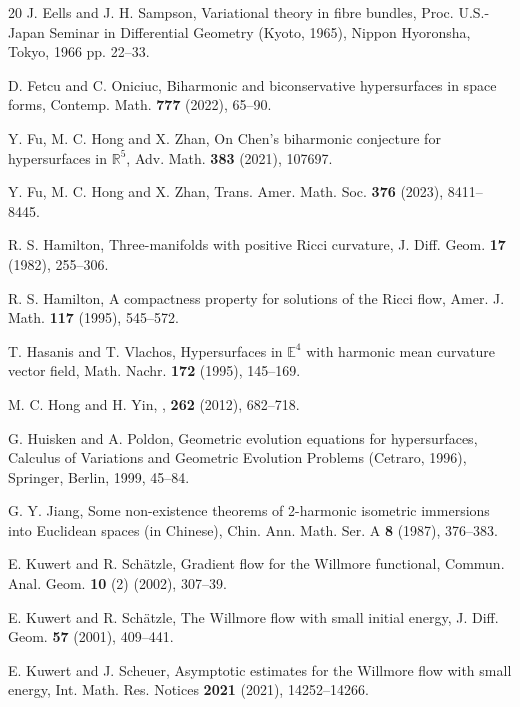\documentclass{amsart}
\theoremstyle{definition}
\numberwithin{equation}{section}
\begin{document}
{\begin{thebibliography}{20}
J. Eells and J. H. Sampson, Variational theory in fibre bundles,  Proc. U.S.-Japan Seminar
in Differential Geometry (Kyoto, 1965), Nippon Hyoronsha, Tokyo, 1966 pp. 22--33.

D. Fetcu and C. Oniciuc, {Biharmonic and biconservative
	hypersurfaces in space forms}, Contemp. Math. {\bf 777} (2022), 65--90.

Y. Fu, M. C. Hong and X. Zhan, On Chen's biharmonic conjecture for
hypersurfaces in $\mathbb R^5$, Adv. Math. {\bf 383} (2021), 107697.

Y. Fu, M. C. Hong and X. Zhan,     Trans. Amer. Math. Soc.
{\bf 376}   (2023),  8411--8445.



   R. S. Hamilton,  Three-manifolds with positive Ricci curvature, J. Diff. Geom. \textbf{17} (1982), 255--306.

   R. S. Hamilton,   A compactness property for solutions of the Ricci flow,  {Amer. J. Math.} {\bf 117} (1995), 545--572.


T. Hasanis and T. Vlachos, Hypersurfaces in $\mathbb E^4$ with
harmonic mean curvature vector field, Math. Nachr. {\bf 172} (1995),
145--169.

  M. C. Hong   and H. Yin,
    ,
     {\bf  262} (2012), 682--718.




   G. Huisken and A. Poldon,  {Geometric evolution equations for hypersurfaces}, Calculus of Variations and Geometric Evolution Problems
   (Cetraro, 1996), Springer, Berlin, 1999, 45--84.

G. Y. Jiang, Some non-existence theorems of 2-harmonic isometric
immersions into Euclidean spaces (in Chinese), Chin. Ann. Math. Ser. A {\bf
8} (1987), 376--383.

    E. Kuwert and  R. Sch\"{a}tzle,  {Gradient flow for the Willmore functional},   Commun. Anal.
Geom. \textbf{10} (2) (2002), 307--39.



 E. Kuwert and R. Sch\"{a}tzle,
    {The Willmore flow with small initial energy}, J. Diff. Geom. \textbf{57} (2001), 409--441.

     E. Kuwert and J. Scheuer, {Asymptotic estimates for the Willmore flow with small
energy},   Int. Math. Res. Notices \textbf{2021} (2021),  14252--14266.





\end{thebibliography}}
\end{document}
